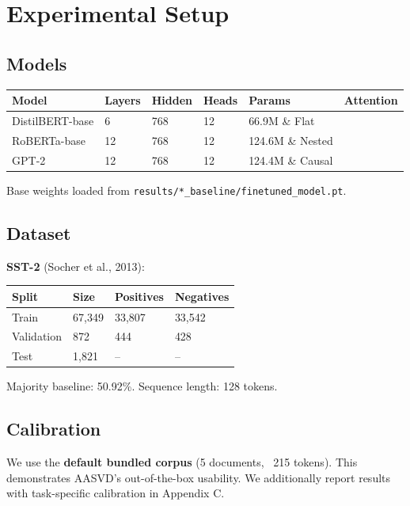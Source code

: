 
\section{Experimental Setup}

\subsection{Models}

\begin{table}[H]
\centering
\small
\begin{tabular}{llllll}
\toprule
\textbf{Model} & \textbf{Layers} & \textbf{Hidden} & \textbf{Heads} & \textbf{Params} & \textbf{Attention} \\
\midrule
DistilBERT-base & 6 & 768 & 12 & 66.9M \& Flat \\
RoBERTa-base & 12 & 768 & 12 & 124.6M \& Nested \\
GPT-2 & 12 & 768 & 12 & 124.4M \& Causal \\
\bottomrule
\end{tabular}
\end{table}

Base weights loaded from \texttt{results/*\_baseline/finetuned\_model.pt}.

\subsection{Dataset}

\textbf{SST-2} (Socher et al., 2013):

\begin{table}[H]
\centering
\small
\begin{tabular}{llll}
\toprule
\textbf{Split} & \textbf{Size} & \textbf{Positives} & \textbf{Negatives} \\
\midrule
Train & 67,349 & 33,807 & 33,542 \\
Validation & 872 & 444 & 428 \\
Test & 1,821 & -- & -- \\
\bottomrule
\end{tabular}
\end{table}

Majority baseline: 50.92\%. Sequence length: 128 tokens.

\subsection{Calibration}

We use the \textbf{default bundled corpus} (5 documents, ~215 tokens). This 
demonstrates AASVD's out-of-the-box usability. We additionally report 
results with task-specific calibration in Appendix C.

